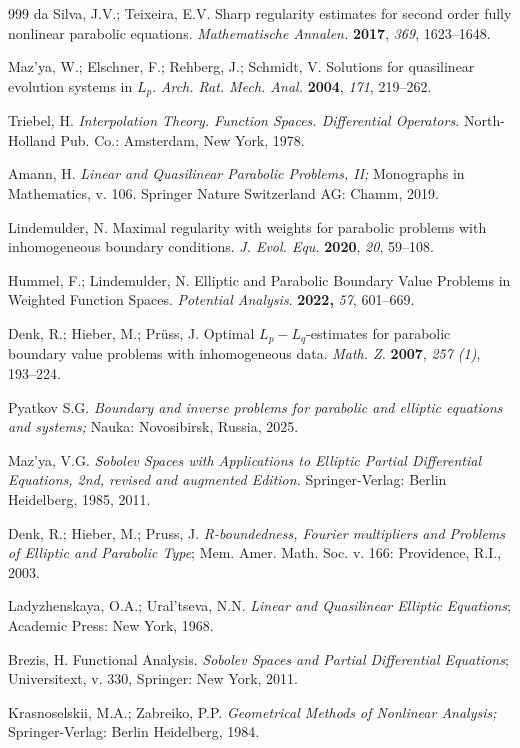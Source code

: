\documentclass{article}
\theoremstyle{plain}
\begin{document}
\begin{thebibliography}{999}
da Silva, J.V.; Teixeira, E.V. Sharp regularity estimates for second order fully nonlinear parabolic equations. {\it Mathematische Annalen.}  {\bf 2017}, {\it 369},  1623--1648.

Maz'ya, W.;  Elschner, F.;  Rehberg, J.;  Schmidt, V. Solutions for quasilinear evolution
systems in $L_p$. {\it Arch. Rat. Mech. Anal.} {\bf 2004}, {\it 171}, 219--262.

   Triebel, H.
     {\it Interpolation Theory. Function Spaces. Differential Operators.}        North-Holland Pub. Co.: Amsterdam, New York,  1978.
     
  Amann, H. {\it Linear and Quasilinear Parabolic
    Problems, II;} Monographs in Mathematics, v. 106.   Springer Nature Switzerland AG: Chamm,  2019.
 
Lindemulder, N. Maximal regularity with weights for parabolic problems with
inhomogeneous boundary conditions. {\it  J. Evol. Equ.} {\bf 2020}, {\it 20},  59--108.

Hummel, F.;  Lindemulder, N.  Elliptic and Parabolic Boundary Value Problems
in Weighted Function Spaces. {\it Potential Analysis}. {\bf 2022,} {\it 57}, 601--669.

 
 Denk, R.; Hieber, M.; Pr\"{u}ss, J. Optimal
    $L_{p}-L_{q}$-estimates for parabolic boundary value
    problems with inhomogeneous data. {\it Math. Z.} {\bf 2007}, {\it 257 (1)}, 193--224.
     
        Pyatkov S.G. {\it Boundary and inverse problems for parabolic and elliptic equations and systems;} Nauka: Novosibirsk, Russia, 2025. 

 Maz'ya, V.G. {\it Sobolev Spaces with Applications to Elliptic Partial
Differential Equations, 2nd, revised and augmented Edition.} Springer-Verlag: Berlin Heidelberg, 1985, 2011.

  Denk, R.;  Hieber, M.; Pruss, J.  {\it R-boundedness, Fourier multipliers and Problems
 of Elliptic and Parabolic Type}; Mem. Amer. Math. Soc. v. 166: Providence, R.I., 2003.

 Ladyzhenskaya, O.A.;  Ural'tseva, N.N.  {\it Linear and Quasilinear Elliptic Equations};
 Academic Press: New York, 1968.

Brezis, H. Functional Analysis. {\it Sobolev Spaces and Partial Differential Equations}; Universitext, v. 330,
Springer: New York, 2011.
 

     Krasnoselskii, M.A.;   Zabreiko, P.P. {\it Geometrical Methods of Nonlinear Analysis;}  Springer-Verlag: Berlin Heidelberg, 1984.



\end{thebibliography}
\end{document}
